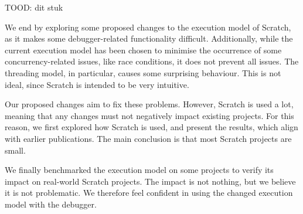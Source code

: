 \documentclass[main]{subfiles}
\begin{document}
TOOD: dit stuk

We end by exploring some proposed changes to the execution model of Scratch, as it makes some debugger-related functionality difficult.
Additionally, while the current execution model has been chosen to minimise the occurrence of some concurrency-related issues, like race conditions, it does not prevent all issues.
The threading model, in particular, causes some surprising behaviour.
This is not ideal, since Scratch is intended to be very intuitive.

Our proposed changes aim to fix these problems.
However, Scratch is used a lot, meaning that any changes must not negatively impact existing projects.
For this reason, we first explored how Scratch is used, and present the results, which align with earlier publications.
The main conclusion is that most Scratch projects are small.

We finally benchmarked the execution model on some projects to verify its impact on real-world Scratch projects.
The impact is not nothing, but we believe it is not problematic.
We therefore feel confident in using the changed execution model with the debugger.
\end{document}
